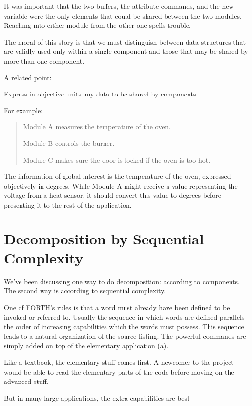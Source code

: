 It was important that the two buffers, the attribute commands, and
the new variable were the only elements that could be shared between the
two modules. Reaching into either module from the other one spells
trouble.

The moral of this story is that we must distinguish between data
structures that are validly used only within a single component and those
that may be shared by more than one component.

A related point:

\begin{tip}
Express in objective units any data to be shared by components.
\end{tip}

For example:

\begin{quotation}
	Module A measures the temperature of the oven.

	Module B controls the burner.

	Module C makes sure the door is locked if the oven is too hot.
\end{quotation}

The information of global interest is the temperature of the oven,
expressed objectively in degrees. While Module A might receive a value
representing the voltage from a heat sensor, it should convert this
value to degrees before presenting it to the rest of the application.

\section{Decomposition by Sequential Complexity}

We've been discussing one way to do decomposition: according to
components. The second way is according to sequential complexity.

One of FORTH's rules is that a word must already have been defined to
be invoked or referred to. Usually the sequence in which words are
defined parallels the order of increasing capabilities which the words
must possess. This sequence leads to a natural organization of the
source listing. The powerful commands are simply added on top of the
elementary application (a).

Like a textbook, the elementary stuff comes first. A newcomer to
the project would be able to read the elementary parts of the code before
moving on the advanced stuff.

But in many large applications, the extra capabilities are best


